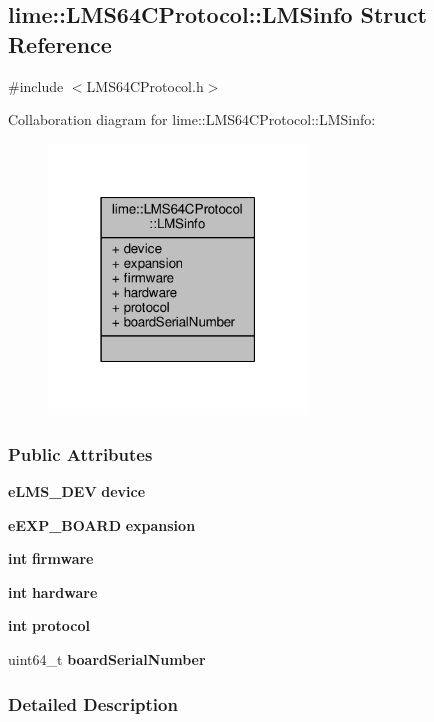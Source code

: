 \subsection{lime\+:\+:L\+M\+S64\+C\+Protocol\+:\+:L\+M\+Sinfo Struct Reference}
\label{structlime_1_1LMS64CProtocol_1_1LMSinfo}


{\ttfamily \#include $<$L\+M\+S64\+C\+Protocol.\+h$>$}



Collaboration diagram for lime\+:\+:L\+M\+S64\+C\+Protocol\+:\+:L\+M\+Sinfo\+:
\nopagebreak
\begin{figure}[H]
\begin{center}
\leavevmode
\includegraphics[width=195pt]{d9/d22/structlime_1_1LMS64CProtocol_1_1LMSinfo__coll__graph}
\end{center}
\end{figure}
\subsubsection*{Public Attributes}
\begin{DoxyCompactItemize}
\item 
{\bf e\+L\+M\+S\+\_\+\+D\+EV} {\bf device}
\item 
{\bf e\+E\+X\+P\+\_\+\+B\+O\+A\+RD} {\bf expansion}
\item 
{\bf int} {\bf firmware}
\item 
{\bf int} {\bf hardware}
\item 
{\bf int} {\bf protocol}
\item 
uint64\+\_\+t {\bf board\+Serial\+Number}
\end{DoxyCompactItemize}


\subsubsection{Detailed Description}


